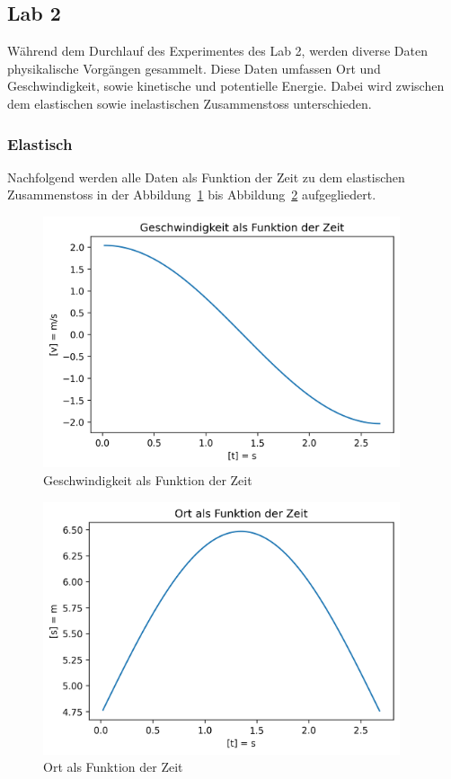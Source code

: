 \documentclass[../main.tex]{subfiles}
\begin{document}
    \subsection{Lab 2}
    Während dem Durchlauf des Experimentes des Lab 2, werden diverse Daten physikalische Vorgängen
    gesammelt. Diese Daten umfassen Ort und Geschwindigkeit, sowie kinetische und potentielle Energie.
    Dabei wird zwischen dem elastischen sowie inelastischen Zusammenstoss unterschieden.
    \subsubsection{Elastisch}
    Nachfolgend werden alle Daten als Funktion der Zeit zu dem elastischen Zusammenstoss in der
    Abbildung~\ref{fig:GeschwindigkeitAlsFunktionDerZeit} bis Abbildung~\ref{fig:OrtAlsFunktionDerZeit}
    aufgegliedert.

    \begin{figure}[H]
        \begin{center}
            \centerline{\includegraphics[width=105mm]{./images/Elastisch/GeschwindigkeitAlsFunktionDerZeit}}
            \caption{Geschwindigkeit als Funktion der Zeit}
            \label{fig:GeschwindigkeitAlsFunktionDerZeit}
        \end{center}
    \end{figure}

    \begin{figure}[H]
        \begin{center}
            \centerline{\includegraphics[width=105mm]{./images/Elastisch/OrtAlsFunktionDerZeit}}
            \caption{Ort als Funktion der Zeit}
            \label{fig:OrtAlsFunktionDerZeit}
        \end{center}
    \end{figure}
\end{document}
